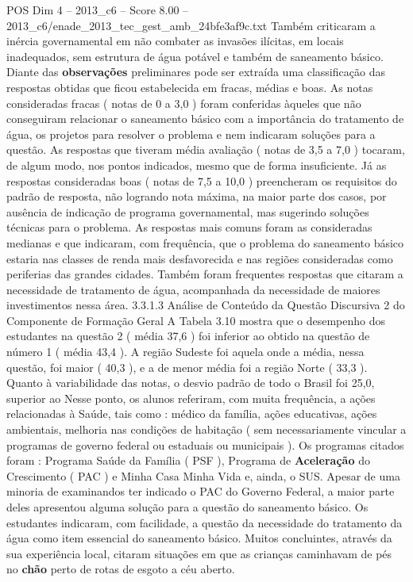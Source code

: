 \begin{textsample}{POS Dim 4 – 2013\_c6 – Score 8.00 – 2013\_c6/enade\_2013\_tec\_gest\_amb\_24bfe3af9c.txt}
Também criticaram a inércia governamental em não combater as invasões ilícitas, em locais inadequados, sem estrutura de água potável e também de saneamento básico.
Diante das \textbf{observações} preliminares pode ser extraída uma classificação das respostas obtidas que ficou estabelecida em fracas, médias e boas.
As notas consideradas fracas ( notas de 0 a 3,0 ) foram conferidas àqueles que não conseguiram relacionar o saneamento básico com a importância do tratamento de água, os projetos para resolver o problema e nem indicaram soluções para a questão.
As respostas que tiveram média avaliação ( notas de 3,5 a 7,0 ) tocaram, de algum modo, nos pontos indicados, mesmo que de forma insuficiente.
Já as respostas consideradas boas ( notas de 7,5 a 10,0 ) preencheram os requisitos do padrão de resposta, não logrando nota máxima, na maior parte dos casos, por ausência de indicação de programa governamental, mas sugerindo soluções técnicas para o problema.
As respostas mais comuns foram as consideradas medianas e que indicaram, com frequência, que o problema do saneamento básico estaria nas classes de renda mais desfavorecida e nas regiões consideradas como periferias das grandes cidades.
Também foram frequentes respostas que citaram a necessidade de tratamento de água, acompanhada da necessidade de maiores investimentos nessa área. 3.3.1.3 Análise de Conteúdo da Questão Discursiva 2 do Componente de Formação Geral A Tabela 3.10 mostra que o desempenho dos estudantes na questão 2 ( média 37,6 ) foi inferior ao obtido na questão de número 1 ( média 43,4 ).
A região Sudeste foi aquela onde a média, nessa questão, foi maior ( 40,3 ), e a de menor média foi a região Norte ( 33,3 ).
Quanto à variabilidade das notas, o desvio padrão de todo o Brasil foi 25,0, superior ao Nesse ponto, os alunos referiram, com muita frequência, a ações relacionadas à Saúde, tais como : médico da família, ações educativas, ações ambientais, melhoria nas condições de habitação ( sem necessariamente vincular a programas de governo federal ou estaduais ou municipais ).
Os programas citados foram : Programa Saúde da Família ( PSF ), Programa de \textbf{Aceleração} do Crescimento ( PAC ) e Minha Casa Minha Vida e, ainda, o SUS.
Apesar de uma minoria de examinandos ter indicado o PAC do Governo Federal, a maior parte deles apresentou alguma solução para a questão do saneamento básico.
Os estudantes indicaram, com facilidade, a questão da necessidade do tratamento da água como item essencial do saneamento básico.
Muitos concluintes, através da sua experiência local, citaram situações em que as crianças caminhavam de pés no \textbf{chão} perto de rotas de esgoto a céu aberto.

\end{textsample}
